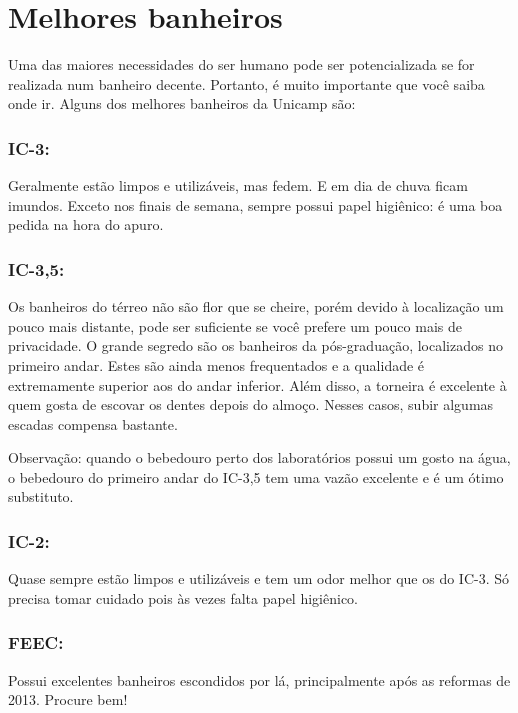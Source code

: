 
\section{Melhores banheiros}

Uma das maiores necessidades do ser humano pode ser potencializada se for
realizada num banheiro decente. Portanto, é muito importante que você saiba
onde ir. Alguns dos melhores banheiros da Unicamp são:

\subsubsection{IC-3:} Geralmente estão limpos e utilizáveis, mas fedem. E em
dia de chuva ficam imundos. Exceto nos finais de semana, sempre possui papel
higiênico: é uma boa pedida na hora do apuro.

\subsubsection{IC-3,5:} Os banheiros do térreo não são flor que se cheire, porém
devido à localização um pouco mais distante, pode ser suficiente se você prefere
um pouco mais de privacidade. O grande segredo são os banheiros da
pós-graduação, localizados no primeiro andar. Estes são ainda menos
frequentados e a qualidade é extremamente superior aos do andar inferior. Além
disso, a torneira é excelente à quem gosta de escovar os dentes depois do
almoço. Nesses casos, subir algumas escadas compensa bastante.

Observação: quando o bebedouro perto dos laboratórios possui um gosto na água, o
bebedouro do primeiro andar do IC-3,5 tem uma vazão excelente e é um ótimo
substituto.

\subsubsection{IC-2:} Quase sempre estão limpos e utilizáveis e tem um odor
melhor que os do IC-3. Só precisa tomar cuidado pois às vezes falta papel
higiênico.

\subsubsection{FEEC:} Possui excelentes banheiros escondidos por lá,
principalmente após as reformas de 2013. Procure bem!

